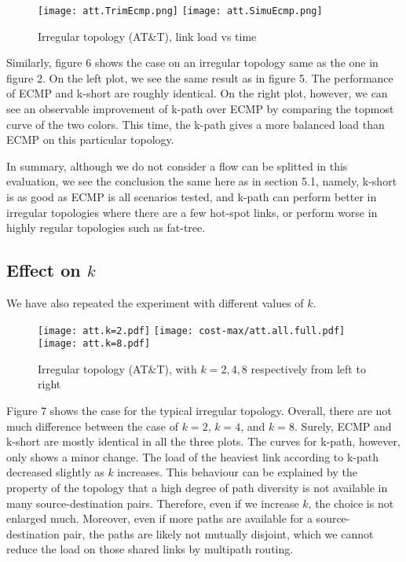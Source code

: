 \documentclass[conference]{IEEEtran}
\begin{document}
\begin{figure}[h]
\centering\texttt{[image: att.TrimEcmp.png]}
\centering\texttt{[image: att.SimuEcmp.png]}
\caption{Irregular topology (AT\&T), link load vs time}
\end{figure}

Similarly, figure 6 shows the case on an irregular topology same as the one in
figure 2. On the left plot, we see the same result as in figure 5. The
performance of ECMP and k-short are roughly identical. On the right plot,
however, we can see an observable improvement of k-path over ECMP by comparing
the topmost curve of the two colors. This time, the k-path gives a more
balanced load than ECMP on this particular topology.

In summary, although we do not consider a flow can be splitted in this
evaluation, we see the conclusion the same here as in section 5.1, namely,
k-short is as good as ECMP is all scenarios tested, and k-path can perform
better in irregular topologies where there are a few hot-spot links, or perform
worse in highly regular topologies such as fat-tree.

\subsection{Effect on $k$}

We have also repeated the experiment with different values of $k$.

\begin{figure*}
\texttt{[image: att.k=2.pdf]}%
\texttt{[image: cost-max/att.all.full.pdf]}%
\texttt{[image: att.k=8.pdf]}
\caption{Irregular topology (AT\&T), with $k=2,4,8$ respectively from left to right}
\end{figure*}

Figure 7 shows the case for the typical irregular topology. Overall, there are
not much difference between the case of $k=2$, $k=4$, and $k=8$. Surely, ECMP
and k-short are mostly identical in all the three plots. The curves for k-path,
however, only shows a minor change. The load of the heaviest link according to
k-path decreased slightly as $k$ increases. This behaviour can be explained by
the property of the topology that a high degree of path diversity is not
available in many source-destination pairs. Therefore, even if we increase $k$,
the choice is not enlarged much. Moreover, even if more paths are available for
a source-destination pair, the paths are likely not mutually disjoint, which we
cannot reduce the load on those shared links by multipath routing.
\end{document}
